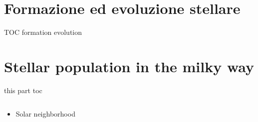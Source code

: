 \documentclass[8pt,xcolor,fleqn]{beamer}
\makeatletter
\newcommand{\linkdest}[2][\@empty]{%
    \hypertarget{\@empty}{#1}
\Hy@raisedlink{%
\hypertarget{#2}{}
}%
}
\makeatother
\begin{document}
  \part{Formazione ed evoluzione stellare} 
\begin{frame}{TOC formation evolution}
\tableofcontents
\end{frame}


 
 \part{Stellar population in the milky way}%
\begin{frame}{this part toc}
\begin{columns}[T]
\begin{column}{0.5\textwidth}
\begin{itemize}
	\item Solar neighborhood
\end{itemize}
\end{column}
\begin{column}{0.5\textwidth}
\tableofcontents
\end{column}
\end{columns}
\end{frame}

  
\end{document}
